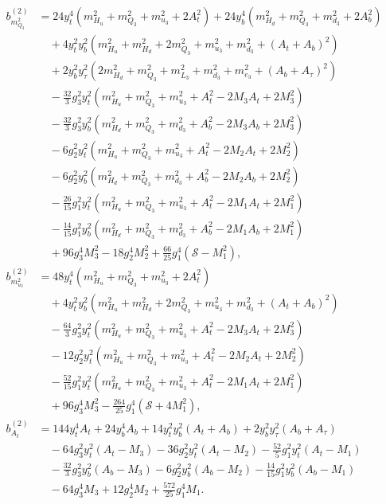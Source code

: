 \documentclass[preprint,amsmath,amssymb,aps,superscriptaddress,prd,showpacs,floatfix,nofootinbib]{revtex4-1}
\begin{document}
\begin{subequations}\label{eq:MSSMsEffPotCoeffs}
\begin{align}
b_{m_{Q_3}^2}^{(2)}&=24y_t^4\left ( m_{H_u}^2+m_{Q_3}^2+m_{u_3}^2+2A_t^2\right )+24y_b^4\left ( m_{H_d}^2+m_{Q_3}^2+m_{d_3}^2+2A_b^2\right )\nonumber\\
&\quad{}+4y_t^2y_b^2\left ( m_{H_u}^2+m_{H_d}^2+2m_{Q_3}^2+m_{u_3}^2+m_{d_3}^2+(A_t+A_b)^2\right )\nonumber\\
&\quad{}+2y_b^2y_\tau^2\left ( 2m_{H_d}^2+m_{Q_3}^2+m_{L_3}^2+m_{d_3}^2+m_{e_3}^2+(A_b+A_\tau)^2\right )\nonumber\\
&\quad{}-\frac{32}{3}g_3^2y_t^2\left ( m_{H_u}^2+m_{Q_3}^2+m_{u_3}^2+A_t^2-2M_3A_t+2M_3^2\right )\nonumber\\
&\quad{}-\frac{32}{3}g_3^2y_b^2\left ( m_{H_d}^2+m_{Q_3}^2+m_{d_3}^2+A_b^2-2M_3A_b+2M_3^2\right )\nonumber\\
&\quad{}-6g_2^2y_t^2\left ( m_{H_u}^2+m_{Q_3}^2+m_{u_3}^2+A_t^2-2M_2A_t+2M_2^2\right )\nonumber\\
&\quad{}-6g_2^2y_b^2\left ( m_{H_d}^2+m_{Q_3}^2+m_{d_3}^2+A_b^2-2M_2A_b+2M_2^2\right )\nonumber\\
&\quad{}-\frac{26}{15}g_1^2y_t^2\left ( m_{H_u}^2+m_{Q_3}^2+m_{u_3}^2+A_t^2-2M_1A_t+2M_1^2\right )\nonumber\\
&\quad{}-\frac{14}{15}g_1^2y_b^2\left ( m_{H_d}^2+m_{Q_3}^2+m_{d_3}^2+A_b^2-2M_1A_b+2M_1^2\right )\nonumber\\
&\quad{}+96g_3^4M_3^2-18g_2^4M_2^2+\frac{66}{25}g_1^4(\mathcal{S}-M_1^2),\label{eq:MSSMmQ32b2}\\
b_{m_{u_3}^2}^{(2)}&=48y_t^4\left ( m_{H_u}^2+m_{Q_3}^2+m_{u_3}^2+2A_t^2\right )\nonumber\\
&\quad{}+4y_t^2y_b^2\left ( m_{H_u}^2+m_{H_d}^2+2m_{Q_3}^2+m_{u_3}^2+m_{d_3}^2+(A_t+A_b)^2\right )\nonumber\\
&\quad{}-\frac{64}{3}g_3^2y_t^2\left ( m_{H_u}^2+m_{Q_3}^2+m_{u_3}^2+A_t^2-2M_3A_t+2M_3^2\right )\nonumber\\
&\quad{}-12g_2^2y_t^2\left ( m_{H_u}^2+m_{Q_3}^2+m_{u_3}^2+A_t^2-2M_2A_t+2M_2^2\right )\nonumber\\
&\quad{}-\frac{52}{15}g_1^2y_t^2\left ( m_{H_u}^2+m_{Q_3}^2+m_{u_3}^2+A_t^2-2M_1A_t+2M_1^2\right )\nonumber\\
&\quad{}+96g_3^4M_3^2-\frac{264}{25}g_1^4\left ( \mathcal{S}+4M_1^2\right ),\label{eq:MSSMmu32b2}\\
b_{A_t}^{(2)}&=144y_t^4A_t+24y_b^4A_b+14y_t^2y_b^2(A_t+A_b)+2y_b^2y_\tau^2(A_b+A_\tau)\nonumber\\
&\quad{}-64g_3^2y_t^2(A_t-M_3)-36g_2^2y_t^2(A_t-M_2)-\frac{52}{5}g_1^2y_t^2(A_t-M_1)\nonumber\\
&\quad{}-\frac{32}{3}g_3^2y_b^2(A_b-M_3)-6g_2^2y_b^2(A_b-M_2)-\frac{14}{15}g_1^2y_b^2(A_b-M_1)\nonumber\\
&\quad{}-64g_3^4M_3+12g_2^4M_2+\frac{572}{25}g_1^4M_1.\label{eq:MSSMAtb2}
\end{align}
\end{subequations}
\end{document}
